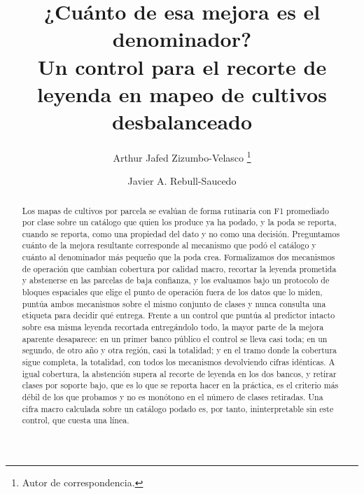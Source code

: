\documentclass[runningheads]{llncs}
\newif\ifanon
\begin{document}
\title{¿Cuánto de esa mejora es el denominador?\texorpdfstring{\\}{ }Un control para el recorte de leyenda en mapeo de cultivos desbalanceado}

\ifanon
  \author{Autoría anónima}
  \institute{Institución anónima}
\else
  \author{%
    Arthur Jafed Zizumbo-Velasco%
    \thanks{Autor de correspondencia.}
    \and
    Javier A. Rebull-Saucedo%
  }
\fi

\maketitle

\begin{abstract}
Los mapas de cultivos por parcela se evalúan de forma rutinaria con F1 promediado por clase sobre
un catálogo que quien los produce ya ha podado, y la poda se reporta, cuando se reporta, como una
propiedad del dato y no como una decisión. Preguntamos cuánto de la mejora resultante corresponde
al mecanismo que podó el catálogo y cuánto al denominador más pequeño que la poda crea.
Formalizamos dos mecanismos de operación que cambian cobertura por calidad macro, recortar la
leyenda prometida y abstenerse en las parcelas de baja confianza, y los evaluamos bajo un
protocolo de bloques espaciales que elige el punto de operación fuera de los datos que lo miden,
puntúa ambos mecanismos sobre el mismo conjunto de clases y nunca consulta una etiqueta para
decidir qué entrega. Frente a un control que puntúa al predictor intacto sobre esa misma leyenda
recortada entregándolo todo, la mayor parte de la mejora aparente desaparece: en un primer banco
público el control se lleva casi toda; en un segundo, de otro año y otra región, casi la
totalidad; y en el tramo donde la cobertura sigue completa, la totalidad, con todos los mecanismos
devolviendo cifras idénticas. A igual cobertura, la abstención supera al recorte de leyenda en los
dos bancos, y retirar clases por soporte bajo, que es lo que se reporta hacer en la práctica, es
el criterio más débil de los que probamos y no es monótono en el número de clases retiradas. Una
cifra macro calculada sobre un catálogo podado es, por tanto, ininterpretable sin este control,
que cuesta una línea.

\end{abstract}
\end{document}
